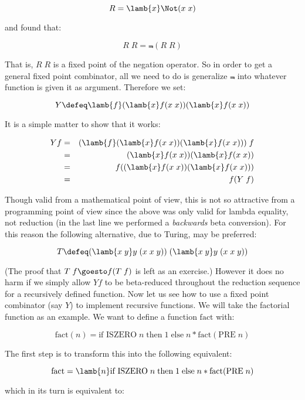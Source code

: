 $$ R = \lamb{x} \Not (x\; x) $$

\noindent and found that:

$$ R\; R = \Not (R\; R) $$

That is, $R\; R$ is a fixed point of the negation operator. So in order to get
a general fixed point combinator, all we need to do is generalize $\Not$ into
whatever function is given it as argument. Therefore we set:

$$ Y \defeq \lamb{f} (\lamb{x} f(x\; x)) (\lamb{x} f(x\; x)) $$

\noindent It is a simple matter to show that it works:

\begin{eqnarray*}
Y f  & = & (\lamb{f} (\lamb{x} f(x\; x)) (\lamb{x} f(x\; x)))\; f       \\
     & = & (\lamb{x} f(x\; x)) (\lamb{x} f(x\; x))                      \\
     & = & f((\lamb{x} f(x\; x)) (\lamb{x} f(x\; x)))                   \\
     & = & f(Y\; f)
\end{eqnarray*}

Though valid from a mathematical point of view, this is not so attractive from
a programming point of view since the above was only valid for lambda equality,
not reduction (in the last line we performed a {\em backwards} beta
conversion). For this reason the following alternative, due to Turing, may be
preferred:

$$ T \defeq (\lamb{x\; y} y\; (x\; x\; y))\; (\lamb{x\; y} y\; (x\; x\; y)) $$

(The proof that $T\; f \goesto f(T\; f)$ is left as an exercise.) However it
does no harm if we simply allow $Y f$ to be beta-reduced throughout the
reduction sequence for a recursively defined function. Now let us see how to
use a fixed point combinator (say $Y$) to implement recursive functions. We
will take the factorial function as an example. We want to define a function
$\mbox{fact}$ with:

$$ \mbox{fact}(n) = \mbox{if ISZERO}\; n\; \mbox{then}\; 1\; \mbox{else}\;
                   n * \mbox{fact}(\mbox{PRE}\; n) $$

The first step is to transform this into the following equivalent:

$$ \mbox{fact} = \lamb{n} \mbox{if ISZERO}\; n\; \mbox{then}\; 1\;
\mbox{else}\; n * \mbox{fact}(\mbox{PRE}\; n) $$

\noindent which in its turn is equivalent to:

